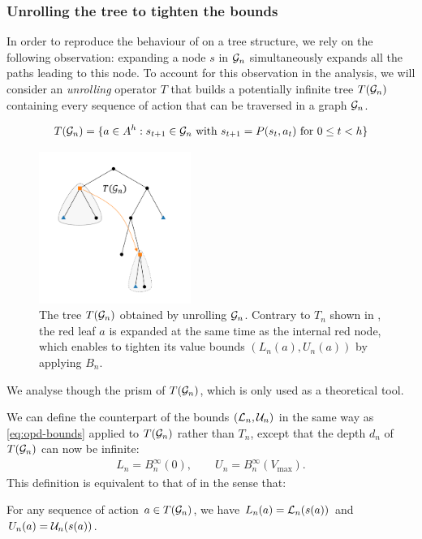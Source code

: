 \subsubsection{Unrolling the tree to tighten the bounds}
\label{sec:unrolling}

In order to reproduce the behaviour of  on a tree structure, we rely on the following observation:  expanding a node $s$ in $\mathcal{G}_n$ simultaneously expands all the paths leading to this node.
To account for this observation in the analysis, we will consider an \emph{unrolling} operator $T$ that builds a potentially infinite tree $T(\mathcal{G}_n)$ containing every sequence of action that can be traversed in a graph $\mathcal{G}_n$.

\begin{equation}
T(\mathcal{G}_n) = \{a\in A^h: s_{t+1} \in \mathcal{G}_n \text{ with } s_{t+1} = P(s_{t}, a_t)\text{ for } 0 \leq t < h\}
\end{equation}

\begin{figure}[htp]
	\centering
	\includegraphics[trim={2.cm 1cm 2.5cm 1cm}, clip, width=0.44\textwidth]{img/gbop/tree_5.pdf}
	\caption{The tree $T(\mathcal{G}_n)$ obtained by unrolling $\mathcal{G}_n$. Contrary to $T_n$ shown in , the red leaf $a$ is expanded at the same time as the internal red node, which enables to tighten its value bounds $(L_n(a), U_n(a))$ by applying $B_n$.}
	\label{fig:unroll}
\end{figure}
We analyse \GBOPD though the prism of $T(\mathcal{G}_n)$, which is only used as a theoretical tool. 

We can define the counterpart of the bounds $(\mathcal{L}_n, \mathcal{U}_n)$ in the same way as \eqref{eq:opd-bounds} applied to $T(\mathcal{G}_n)$ rather than $T_n$, except that the depth $d_n$ of $T(\mathcal{G}_n)$ can now be infinite:
\begin{align}
\label{eq:gbop-t-bounds}
L_n = B_n^{\infty}(0), \qquad U_n = B_n^{\infty}(V_{\max}).
\end{align}
This definition is equivalent to that of \GBOPD in the sense that:
\begin{lemma}
	\label{lem:equivalence}
	For any sequence of action $a\in T(\mathcal{G}_n)$, we have $L_n(a) = \mathcal{L}_n(s(a))$ and $U_n(a) = \mathcal{U}_n(s(a))$.	
\end{lemma}

